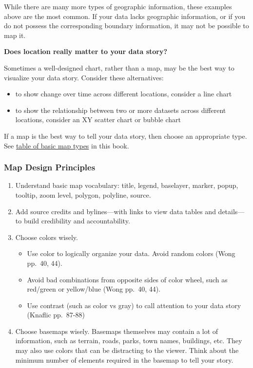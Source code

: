 \documentclass[
  english,
]{book}
\providecommand{\tightlist}{%
  \setlength{\itemsep}{0pt}\setlength{\parskip}{0pt}}
\begin{document}
While there are many more types of geographic information, these examples above are the most common. If your data lacks geographic information, or if you do not possess the corresponding boundary information, it may not be possible to map it.

\textbf{Does location really matter to your data story?}

Sometimes a well-designed chart, rather than a map, may be the best way to visualize your data story. Consider these alternatives:

\begin{itemize}
\tightlist
\item
  to show change over time across different locations, consider a line chart
\end{itemize}

\begin{itemize}
\tightlist
\item
  to show the relationship between two or more datasets across different locations, consider an XY scatter chart or bubble chart
\end{itemize}

If a map is the best way to tell your data story, then choose an appropriate type. See \href{map}{table of basic map types} in this book.

\hypertarget{map-design-principles}{%
\subsubsection{Map Design Principles}\label{map-design-principles}}

\begin{enumerate}
\def\labelenumi{\arabic{enumi}.}
\item
  Understand basic map vocabulary: title, legend, baselayer, marker, popup, tooltip, zoom level, polygon, polyline, source.
\item
  Add source credits and bylines---with links to view data tables and details---to build credibility and accountability.
\item
  Choose colors wisely.

  \begin{itemize}
  \tightlist
  \item
    Use color to logically organize your data. Avoid random colors (Wong pp.~40, 44).
  \item
    Avoid bad combinations from opposite sides of color wheel, such as red/green or yellow/blue (Wong pp.~40, 44).
  \item
    Use contrast (such as color vs gray) to call attention to your data story (Knaflic pp.~87-88)
  \end{itemize}
\item
  Choose basemaps wisely. Basemaps themselves may contain a lot of information, such as terrain, roads, parks, town names, buildings, etc. They may also use colors that can be distracting to the viewer. Think about the minimum number of elements required in the basemap to tell your story.
\end{enumerate}
\end{document}
